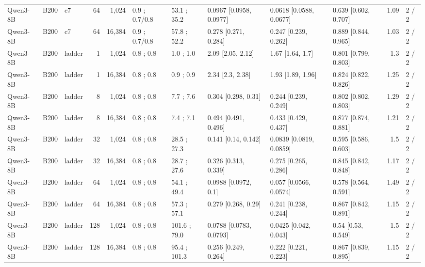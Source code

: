 \begin{landscape}
\begin{longtable}{lllrrlllllrl}
Qwen3-8B & B200 & c7 & 64 & 1,024 & 0.9 ; 0.7/0.8 & 53.1 ; 35.2 & 0.0967 {[}0.0958, 0.0977{]} & 0.0618 {[}0.0588, 0.0677{]} & 0.639 {[}0.602, 0.707{]} & 1.09 & 2 / 2 \\
Qwen3-8B & B200 & c7 & 64 & 16,384 & 0.9 ; 0.7/0.8 & 57.8 ; 52.2 & 0.278 {[}0.271, 0.284{]} & 0.247 {[}0.239, 0.262{]} & 0.889 {[}0.844, 0.965{]} & 1.03 & 2 / 2 \\
Qwen3-8B & B200 & ladder & 1 & 1,024 & 0.8 ; 0.8 & 1.0 ; 1.0 & 2.09 {[}2.05, 2.12{]} & 1.67 {[}1.64, 1.7{]} & 0.801 {[}0.799, 0.803{]} & 1.3 & 2 / 2 \\
Qwen3-8B & B200 & ladder & 1 & 16,384 & 0.8 ; 0.8 & 0.9 ; 0.9 & 2.34 {[}2.3, 2.38{]} & 1.93 {[}1.89, 1.96{]} & 0.824 {[}0.822, 0.826{]} & 1.25 & 2 / 2 \\
Qwen3-8B & B200 & ladder & 8 & 1,024 & 0.8 ; 0.8 & 7.7 ; 7.6 & 0.304 {[}0.298, 0.31{]} & 0.244 {[}0.239, 0.249{]} & 0.802 {[}0.802, 0.803{]} & 1.29 & 2 / 2 \\
Qwen3-8B & B200 & ladder & 8 & 16,384 & 0.8 ; 0.8 & 7.4 ; 7.1 & 0.494 {[}0.491, 0.496{]} & 0.433 {[}0.429, 0.437{]} & 0.877 {[}0.874, 0.881{]} & 1.21 & 2 / 2 \\
Qwen3-8B & B200 & ladder & 32 & 1,024 & 0.8 ; 0.8 & 28.5 ; 27.3 & 0.141 {[}0.14, 0.142{]} & 0.0839 {[}0.0819, 0.0859{]} & 0.595 {[}0.586, 0.603{]} & 1.5 & 2 / 2 \\
Qwen3-8B & B200 & ladder & 32 & 16,384 & 0.8 ; 0.8 & 28.7 ; 27.6 & 0.326 {[}0.313, 0.339{]} & 0.275 {[}0.265, 0.286{]} & 0.845 {[}0.842, 0.848{]} & 1.17 & 2 / 2 \\
Qwen3-8B & B200 & ladder & 64 & 1,024 & 0.8 ; 0.8 & 54.1 ; 49.4 & 0.0988 {[}0.0972, 0.1{]} & 0.057 {[}0.0566, 0.0574{]} & 0.578 {[}0.564, 0.591{]} & 1.49 & 2 / 2 \\
Qwen3-8B & B200 & ladder & 64 & 16,384 & 0.8 ; 0.8 & 57.3 ; 57.1 & 0.279 {[}0.268, 0.29{]} & 0.241 {[}0.238, 0.244{]} & 0.867 {[}0.842, 0.891{]} & 1.15 & 2 / 2 \\
Qwen3-8B & B200 & ladder & 128 & 1,024 & 0.8 ; 0.8 & 101.6 ; 79.0 & 0.0788 {[}0.0783, 0.0793{]} & 0.0425 {[}0.042, 0.043{]} & 0.54 {[}0.53, 0.549{]} & 1.5 & 2 / 2 \\
Qwen3-8B & B200 & ladder & 128 & 16,384 & 0.8 ; 0.8 & 95.4 ; 101.3 & 0.256 {[}0.249, 0.264{]} & 0.222 {[}0.221, 0.223{]} & 0.867 {[}0.839, 0.895{]} & 1.15 & 2 / 2 \\
\end{longtable}
\endgroup
\end{landscape}
\restoregeometry
